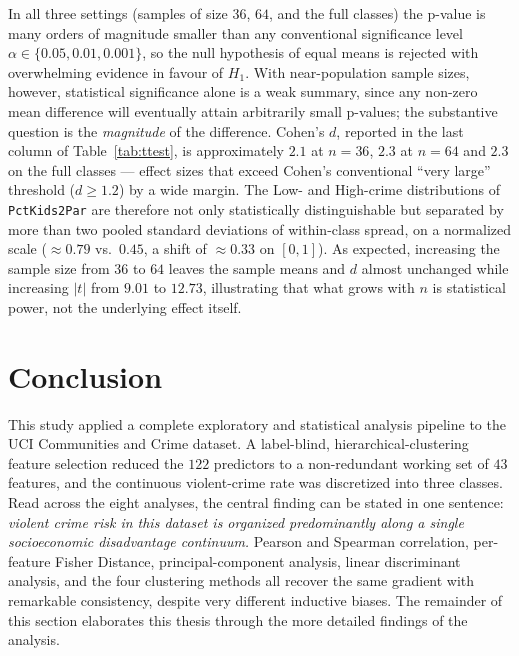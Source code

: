 \documentclass{ieeeaccess}
\begin{document}
In all three settings (samples of size $36$, $64$, and the full classes) the p-value is many orders of magnitude smaller than any conventional significance level $\alpha\in\{0.05, 0.01, 0.001\}$, so the null hypothesis of equal means is rejected with overwhelming evidence in favour of $H_1$. With near-population sample sizes, however, statistical significance alone is a weak summary, since any non-zero mean difference will eventually attain arbitrarily small p-values; the substantive question is the \emph{magnitude} of the difference. Cohen's $d$, reported in the last column of Table~\ref{tab:ttest}, is approximately $2.1$ at $n=36$, $2.3$ at $n=64$ and $2.3$ on the full classes --- effect sizes that exceed Cohen's conventional ``very large'' threshold ($d\!\geq\!1.2$) by a wide margin. The Low- and High-crime distributions of \texttt{PctKids2Par} are therefore not only statistically distinguishable but separated by more than two pooled standard deviations of within-class spread, on a normalized scale ($\approx 0.79$ vs.\ $0.45$, a shift of $\approx 0.33$ on $[0,1]$). As expected, increasing the sample size from $36$ to $64$ leaves the sample means and $d$ almost unchanged while increasing $|t|$ from $9.01$ to $12.73$, illustrating that what grows with $n$ is statistical power, not the underlying effect itself.

\section{Conclusion}
\label{sec:conclusion}
This study applied a complete exploratory and statistical analysis pipeline to the UCI Communities and Crime dataset. A label-blind, hierarchical-clustering feature selection reduced the $122$ predictors to a non-redundant working set of $43$ features, and the continuous violent-crime rate was discretized into three classes. Read across the eight analyses, the central finding can be stated in one sentence: \emph{violent crime risk in this dataset is organized predominantly along a single socioeconomic disadvantage continuum.} Pearson and Spearman correlation, per-feature Fisher Distance, principal-component analysis, linear discriminant analysis, and the four clustering methods all recover the same gradient with remarkable consistency, despite very different inductive biases. The remainder of this section elaborates this thesis through the more detailed findings of the analysis.
\end{document}
